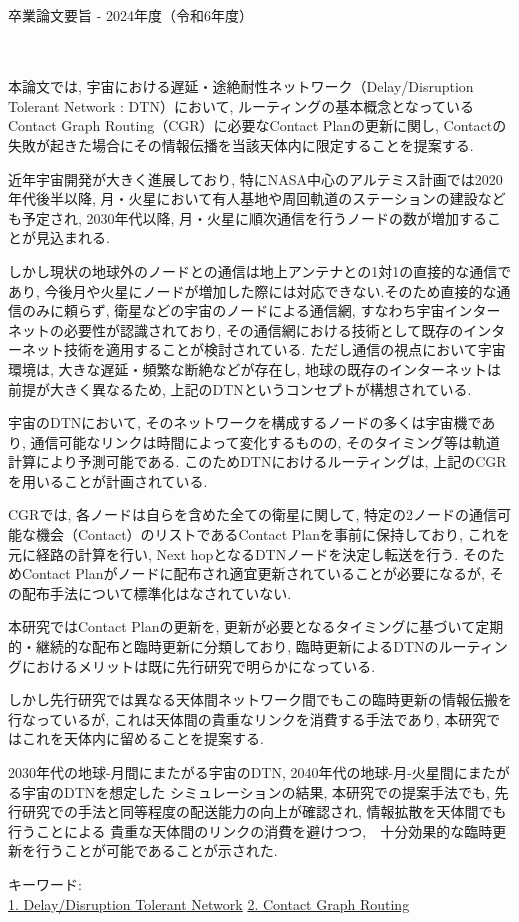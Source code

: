 卒業論文要旨 - 2024年度（令和6年度）
\begin{center}
\begin{large}
\end{large}
\end{center}
\begin{spacing}{1.2}
\small
~ \\
本論文では, 宇宙における遅延・途絶耐性ネットワーク（Delay/Disruption Tolerant Network : DTN）において, 
ルーティングの基本概念となっているContact Graph Routing（CGR）に必要なContact Planの更新に関し, 
Contactの失敗が起きた場合にその情報伝播を当該天体内に限定することを提案する.

近年宇宙開発が大きく進展しており, 特にNASA中心のアルテミス計画では2020年代後半以降, 
月・火星において有人基地や周回軌道のステーションの建設なども予定され, 
2030年代以降, 月・火星に順次通信を行うノードの数が増加することが見込まれる.

しかし現状の地球外のノードとの通信は地上アンテナとの1対1の直接的な通信であり, 
今後月や火星にノードが増加した際には対応できない.そのため直接的な通信のみに頼らず, 
衛星などの宇宙のノードによる通信網, すなわち宇宙インターネットの必要性が認識されており, 
その通信網における技術として既存のインターネット技術を適用することが検討されている.
ただし通信の視点において宇宙環境は, 大きな遅延・頻繁な断絶などが存在し, 
地球の既存のインターネットは前提が大きく異なるため, 
上記のDTNというコンセプトが構想されている.

宇宙のDTNにおいて, そのネットワークを構成するノードの多くは宇宙機であり, 
通信可能なリンクは時間によって変化するものの, そのタイミング等は軌道計算により予測可能である.
このためDTNにおけるルーティングは, 上記のCGRを用いることが計画されている.

CGRでは, 各ノードは自らを含めた全ての衛星に関して, 
特定の2ノードの通信可能な機会（Contact）のリストであるContact Planを事前に保持しており, 
これを元に経路の計算を行い, Next hopとなるDTNノードを決定し転送を行う.
そのためContact Planがノードに配布され適宜更新されていることが必要になるが, 
その配布手法について標準化はなされていない. 

本研究ではContact Planの更新を, 
更新が必要となるタイミングに基づいて定期的・継続的な配布と臨時更新に分類しており, 
臨時更新によるDTNのルーティングにおけるメリットは既に先行研究で明らかになっている.

しかし先行研究では異なる天体間ネットワーク間でもこの臨時更新の情報伝搬を行なっているが, 
これは天体間の貴重なリンクを消費する手法であり, 本研究ではこれを天体内に留めることを提案する. 

2030年代の地球-月間にまたがる宇宙のDTN, 2040年代の地球-月-火星間にまたがる宇宙のDTNを想定した 
シミュレーションの結果, 本研究での提案手法でも, 
先行研究での手法と同等程度の配送能力の向上が確認され, 情報拡散を天体間でも行うことによる
貴重な天体間のリンクの消費を避けつつ,　十分効果的な臨時更新を行うことが可能であることが示された.
~ \\

\end{spacing}

キーワード:\\
\underline{1. Delay/Disruption Tolerant Network} 
\underline{2. Contact Graph Routing} 
\begin{flushright}
\dept \\
\author
\end{flushright}
